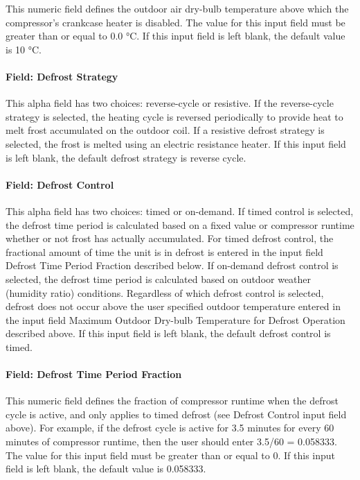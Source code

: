 This numeric field defines the outdoor air dry-bulb temperature above which the compressor's crankcase heater is disabled. The value for this input field must be greater than or equal to 0.0 °C. If this input field is left blank, the default value is 10 °C.

\paragraph{Field: Defrost Strategy}\label{field-defrost-strategy-2}

This alpha field has two choices: reverse-cycle or resistive. If the reverse-cycle strategy is selected, the heating cycle is reversed periodically to provide heat to melt frost accumulated on the outdoor coil. If a resistive defrost strategy is selected, the frost is melted using an electric resistance heater. If this input field is left blank, the default defrost strategy is reverse cycle.

\paragraph{Field: Defrost Control}\label{field-defrost-control-2}

This alpha field has two choices: timed or on-demand. If timed control is selected, the defrost time period is calculated based on a fixed value or compressor runtime whether or not frost has actually accumulated. For timed defrost control, the fractional amount of time the unit is in defrost is entered in the input field Defrost Time Period Fraction described below. If on-demand defrost control is selected, the defrost time period is calculated based on outdoor weather (humidity ratio) conditions. Regardless of which defrost control is selected, defrost does not occur above the user specified outdoor temperature entered in the input field Maximum Outdoor Dry-bulb Temperature for Defrost Operation described above. If this input field is left blank, the default defrost control is timed.

\paragraph{Field: Defrost Time Period Fraction}\label{field-defrost-time-period-fraction-2}

This numeric field defines the fraction of compressor runtime when the defrost cycle is active, and only applies to timed defrost (see Defrost Control input field above). For example, if the defrost cycle is active for 3.5 minutes for every 60 minutes of compressor runtime, then the user should enter 3.5/60 = 0.058333. The value for this input field must be greater than or equal to 0. If this input field is left blank, the default value is 0.058333.

